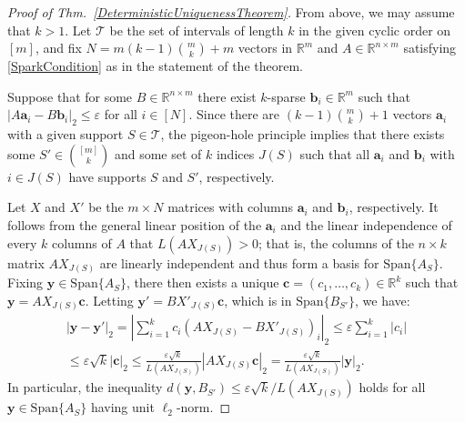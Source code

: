 \documentclass[journal, twocolumn]{IEEEtran}
\begin{document}
\begin{proof}[Proof of Thm.~\ref{DeterministicUniquenessTheorem}]
From above, we may assume that $k > 1$. Let $\mathcal{T}$ be the set of intervals of length $k$ in the given cyclic order on $[m]$, and fix $N = m(k-1){m \choose k}+m$ vectors in $\mathbb{R}^m$ and $A \in \mathbb{R}^{n \times m}$ satisfying \eqref{SparkCondition} as in the statement of the theorem. %

Suppose that for some $B \in \mathbb{R}^{n \times m}$ there exist $k$-sparse \mbox{$\mathbf{b}_i \in \mathbb{R}^m$} such that $|A\mathbf{a}_i - B\mathbf{b}_i|_2 \leq \varepsilon$ for all $i \in [N]$. Since there are $(k-1){m \choose k}+1$ vectors $\mathbf{a}_i$ with a given support $S \in \mathcal{T}$, the pigeon-hole principle implies that there exists some $S' \in {[m] \choose k}$ and some set of $k$ indices $J(S)$ such that all $\mathbf{a}_i$ and $\mathbf{b}_i$ with $i \in J(S)$ have supports $S$ and $S'$, respectively.

Let $X$ and $X'$ be the $m \times N$ matrices with columns $\mathbf{a}_i$ and $\mathbf{b}_i$, respectively. It follows from the general linear position of the $\mathbf{a}_i$ and the linear independence of every $k$ columns of $A$ that $L(AX_{J(S)}) > 0$; that is, the columns of the $n \times k$ matrix $AX_{J(S)}$ are linearly independent and thus form a basis for $\text{Span}\{A_{S}\}$. Fixing $\mathbf{y} \in \text{Span}\{A_{S}\}$, there then exists a unique $\mathbf{c} = (c_1, \ldots, c_k) \in \mathbb{R}^k$ such that $\mathbf{y} = AX_{J(S)}\mathbf{c}$. Letting \mbox{$\mathbf{y'} = BX'_{J(S)}\mathbf{c}$}, which is in $\text{Span}\{B_{S'}\}$, we have:
\begin{align*}
|\mathbf{y} - \mathbf{y'}|_2 
= |\sum_{i=1}^k c_i(AX_{J(S)} - BX'_{J(S)})_i|_2 
\leq \varepsilon \sum_{i=1}^k |c_i| \\
\leq \varepsilon \sqrt{k}  |\mathbf{c}|_2 
\leq \frac{\varepsilon \sqrt{k}}{L(AX_{J(S)})} |AX_{J(S)}\mathbf{c}|_2 
= \frac{\varepsilon \sqrt{k}}{L(AX_{J(S)})} |\mathbf{y}|_2.
\end{align*}
In particular, the inequality $d(\mathbf{y}, B_{S'}) \leq \varepsilon\sqrt{k} / L(AX_{J(S)})$ holds for all $\mathbf{y} \in \text{Span}\{A_{S}\}$ having unit $\ell_2$-norm.


\end{proof}
\end{document}
